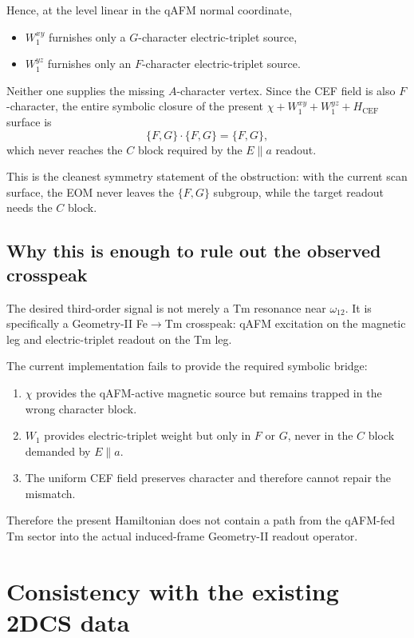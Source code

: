 \documentclass[11pt]{article}
\begin{document}
Hence, at the level linear in the qAFM normal coordinate,
\begin{itemize}[leftmargin=*]
\item $W_1^{xy}$ furnishes only a $G$-character electric-triplet source,
\item $W_1^{yz}$ furnishes only an $F$-character electric-triplet source.
\end{itemize}

Neither one supplies the missing $A$-character vertex. Since the CEF field is
also $F$-character, the entire symbolic closure of the present
$\chi + W_1^{xy} + W_1^{yz} + H_{\mathrm{CEF}}$ surface is
\begin{equation}
\{F,G\} \cdot \{F,G\} = \{F,G\},
\end{equation}
which never reaches the $C$ block required by the $E\parallel a$ readout.

This is the cleanest symmetry statement of the obstruction: with the current
scan surface, the EOM never leaves the $\{F,G\}$ subgroup, while the target
readout needs the $C$ block.

\subsection{Why this is enough to rule out the observed crosspeak}

The desired third-order signal is not merely a Tm resonance near
$\omega_{12}$. It is specifically a Geometry-II Fe$\rightarrow$Tm crosspeak:
qAFM excitation on the magnetic leg and electric-triplet readout on the Tm leg.

The current implementation fails to provide the required symbolic bridge:
\begin{enumerate}[leftmargin=*]
\item $\chi$ provides the qAFM-active magnetic source but remains trapped in the
      wrong character block.
\item $W_1$ provides electric-triplet weight but only in $F$ or $G$, never in
      the $C$ block demanded by $E\parallel a$.
\item The uniform CEF field preserves character and therefore cannot repair the
      mismatch.
\end{enumerate}

Therefore the present Hamiltonian does not contain a path from the qAFM-fed
Tm sector into the actual induced-frame Geometry-II readout operator.

\section{Consistency with the existing 2DCS data}
\end{document}
